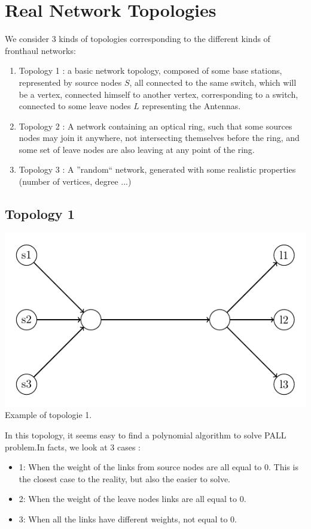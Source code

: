 \documentclass{article}
\begin{document}
\section{Real Network Topologies}

We consider 3 kinds of topologies corresponding to the different kinds of fronthaul networks: 
\begin{enumerate}
 \item Topology 1 : a basic network topology, composed of some base stations, represented by source nodes $S$, all connected to the same switch,
which will be a vertex, connected himself to another vertex, corresponding to a switch, connected to some leave nodes $L$ representing the Antennas.
\item Topology 2 : A network containing an optical ring, such that some sources nodes may join it anywhere, not intersecting themselves before the ring,
and some set of leave nodes are also leaving at any point of the ring.
\item Topology 3 : A ''random`` network, generated with some realistic properties (number of vertices, degree ...)
\end{enumerate}

\subsection{Topology 1}
\begin{center}
 
\includegraphics[scale=1]{Fig4.pdf}\\
Example of topologie 1.
\end{center}

In this topology, it seems easy to find a polynomial algorithm to solve PALL problem.In facts, we look at 3 cases :
\begin{itemize}
 \item 1: When the weight of the links from source nodes are all equal to 0. This is the closest case to the reality, but also the easier to solve.
 \item 2: When the weight of the leave nodes links are all equal to 0.
 \item 3: When all the links have different weights, not equal to 0.
\end{itemize}
\end{document}
